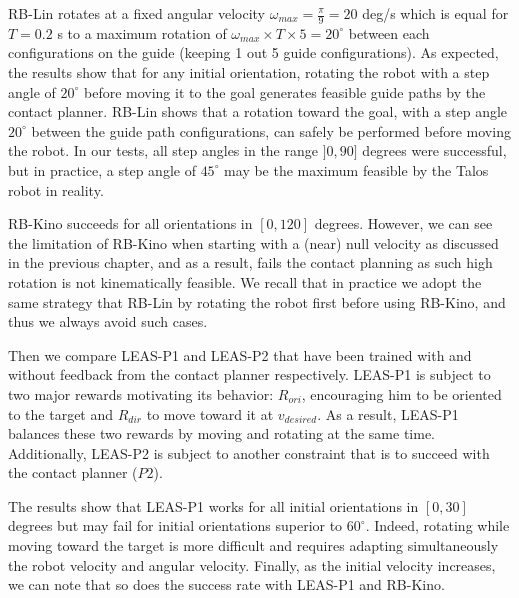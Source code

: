 RB-Lin rotates at a fixed angular velocity $\omega_{max}=\frac{\pi}{9}=20$ deg/s which is equal for $T=0.2$ s to a maximum rotation of $\omega_{max} \times T \times 5 = 20^{\circ}$ between each configurations on the guide (keeping 1 out 5 guide configurations).
As expected, the results show that for any initial orientation, rotating the robot with a step angle of $20^{\circ}$ before moving it to the goal generates feasible guide paths by the contact planner. 
RB-Lin shows that a rotation toward the goal, with a step angle $20^{\circ}$ between the guide path configurations, can safely be performed before moving the robot. 
In our tests, all step angles in the range $]0,90]$ degrees were successful, but in practice, a step angle of $45^{\circ}$ may be the maximum feasible by the Talos robot in reality.

RB-Kino succeeds for all orientations in $[0,120]$ degrees. 
However, we can see the limitation of RB-Kino when starting with a (near) null velocity as discussed in the previous chapter, and as a result, fails the contact planning as such high rotation is not kinematically feasible. 
We recall that in practice we adopt the same strategy that RB-Lin by rotating the robot first before using RB-Kino, and thus we always avoid such cases.

Then we compare LEAS-P1 and LEAS-P2 that have been trained with and without feedback from the contact planner respectively.
LEAS-P1 is subject to two major rewards motivating its behavior: $R_{ori}$, encouraging him to be oriented to the target and $R_{dir}$ to move toward it at $v_{desired}$. 
As a result, LEAS-P1 balances these two rewards by moving and rotating at the same time. 
Additionally, LEAS-P2 is subject to another constraint that is to succeed with the contact planner ($P2$).

The results show that LEAS-P1 works for all initial orientations in $[0,30]$ degrees but may fail for initial orientations superior to $60^{\circ}$.
Indeed, rotating while moving toward the target is more difficult and requires adapting simultaneously the robot velocity and angular velocity.
Finally, as the initial velocity increases, we can note that so does the success rate with LEAS-P1 and RB-Kino.

